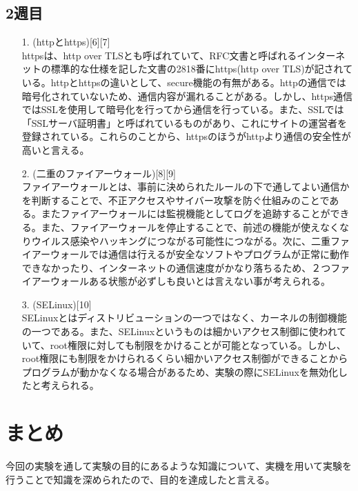 \documentclass[12pt,a4paper]{jsarticle}
\numberwithin{equation}{section}
\numberwithin{figure}{section}
\numberwithin{table}{section}
\begin{document}
  \subsection{2週目}
  \begin{itemize}
    \item [1.](httpとhttps)[6][7]\\
    httpsは、http over TLSとも呼ばれていて、RFC文書と呼ばれるインターネットの標準的な仕様を記した文書の2818番にhttps(http over TLS)が記されている。httpとhttpsの違いとして、secure機能の有無がある。httpの通信では暗号化されていないため、通信内容が漏れることがある。しかし、https通信ではSSLを使用して暗号化を行ってから通信を行っている。また、SSLでは「SSLサーバ証明書」と呼ばれているものがあり、これにサイトの運営者を登録されている。これらのことから、httpsのほうがhttpより通信の安全性が高いと言える。
    \item [2.](二重のファイアーウォール)[8][9]\\
    ファイアーウォールとは、事前に決められたルールの下で通してよい通信かを判断することで、不正アクセスやサイバー攻撃を防ぐ仕組みのことである。またファイアーウォールには監視機能としてログを追跡することができる。また、ファイアーウォールを停止することで、前述の機能が使えなくなりウイルス感染やハッキングにつながる可能性につながる。次に、二重ファイアーウォールでは通信は行えるが安全なソフトやプログラムが正常に動作できなかったり、インターネットの通信速度がかなり落ちるため、２つファイアーウォールある状態が必ずしも良いとは言えない事が考えられる。
    \item [3.](SELinux)[10]\\
    SELinuxとはディストリビューションの一つではなく、カーネルの制御機能の一つである。また、SELinuxというものは細かいアクセス制御に使われていて、root権限に対しても制限をかけることが可能となっている。しかし、root権限にも制限をかけられるくらい細かいアクセス制御ができることからプログラムが動かなくなる場合があるため、実験の際にSELinuxを無効化したと考えられる。
  \end{itemize}
\section{まとめ}
  今回の実験を通して実験の目的にあるような知識について、実機を用いて実験を行うことで知識を深められたので、目的を達成したと言える。
\end{document}
